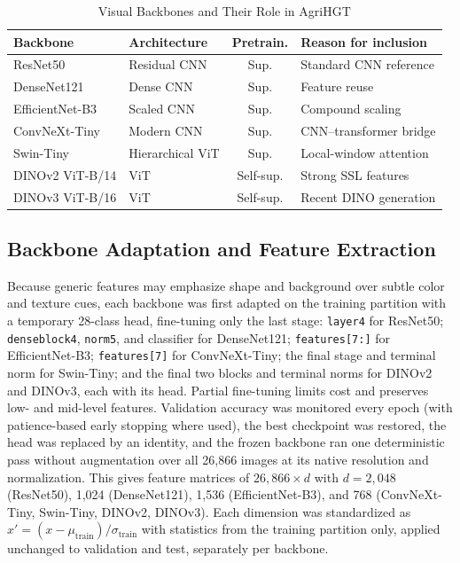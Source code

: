 \documentclass[conference]{IEEEtran}
\begin{document}
\begin{table}[!t]
\centering
\caption{Visual Backbones and Their Role in AgriHGT}
\label{tab:backbone_categories}
\footnotesize
\setlength{\tabcolsep}{2pt}
\begin{tabular}{@{}llcl@{}}
\toprule
\textbf{Backbone} & \textbf{Architecture} & \textbf{Pretrain.} & \textbf{Reason for inclusion} \\
\midrule
ResNet50 & Residual CNN & Sup. & Standard CNN reference \\
DenseNet121 & Dense CNN & Sup. & Feature reuse \\
EfficientNet-B3 & Scaled CNN & Sup. & Compound scaling \\
ConvNeXt-Tiny & Modern CNN & Sup. & CNN--transformer bridge \\
Swin-Tiny & Hierarchical ViT & Sup. & Local-window attention \\
DINOv2 ViT-B/14 & ViT & Self-sup. & Strong SSL features \\
DINOv3 ViT-B/16 & ViT & Self-sup. & Recent DINO generation \\
\bottomrule
\end{tabular}
\end{table}

\subsection{Backbone Adaptation and Feature Extraction}
\label{sec:backbone_adaptation}
Because generic features may emphasize shape and background over subtle color and texture cues, each backbone was first adapted on the training partition with a temporary 28-class head, fine-tuning only the last stage: \texttt{layer4} for ResNet50; \texttt{denseblock4}, \texttt{norm5}, and classifier for DenseNet121; \texttt{features[7:]} for EfficientNet-B3; \texttt{features[7]} for ConvNeXt-Tiny; the final stage and terminal norm for Swin-Tiny; and the final two blocks and terminal norms for DINOv2 and DINOv3, each with its head. Partial fine-tuning limits cost and preserves low- and mid-level features. Validation accuracy was monitored every epoch (with patience-based early stopping where used), the best checkpoint was restored, the head was replaced by an identity, and the frozen backbone ran one deterministic pass without augmentation over all 26,866 images at its native resolution and normalization. This gives feature matrices of $26{,}866\times d$ with $d=2{,}048$ (ResNet50), 1,024 (DenseNet121), 1,536 (EfficientNet-B3), and 768 (ConvNeXt-Tiny, Swin-Tiny, DINOv2, DINOv3). Each dimension was standardized as $x'=(x-\mu_{\mathrm{train}})/\sigma_{\mathrm{train}}$ with statistics from the training partition only, applied unchanged to validation and test, separately per backbone.
\end{document}

